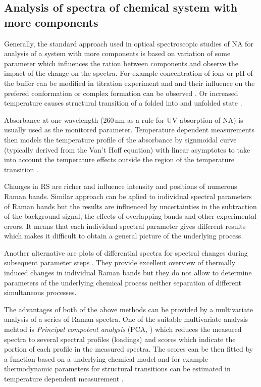 \subsection{Analysis of spectra of chemical system with more components}

Generally, the standard approach used in optical spectroscopic studies of NA
for analysis of a system with more components is based on variation of some
parameter which influences the ration between components and observe the
impact of the change on the spectra.
For example concentration of ions or pH of the buffer can be modified in
titration experiment and and their influence on the prefered conformation or
complex formation can be observed
\parencite{Klener2015}.
Or increased temperature causes structural transition of a folded into and
unfolded state
\parencite{Klener2021}.

Absorbance at one wavelength (260\,nm as a rule for UV absorption of NA) is
usually used as the monitored parameter.
Temperature dependent measurements then models the temperature profile of the
absorbance by signmoidal curve (typically derived from the Van't Hoff equation)
with linear asymptotes to take into account the temperature effects outside
the region of the temperature transition
\parencite{%
	Owczarzy1997,%
	Owczarzy2005,%
	Mergny2009%
}.

Changes in RS are richer and influence intensity and positions of numerous
Raman bands.
Similar approach can be aplied to individual spectral parameters of Raman
bands
\parencite{%
	Duguid1996,%
	Mukerji1996,%
	Mercier1999,%
	Baumruk2001,%
	Movileanu2002a,%
	Knee2008%
}
but the results are influenced by uncertainties in the subtraction of the
background signal, the effects of overlapping bands and other experimental
errors.
It means that each individual spectral parameter gives different results which
makes it difficult to obtain a general picture of the underlying process.

Another alternative are plots of differential spectra for spectral changes
during subsequent parameter steps
\parencite{%
	Duguid1996,%
	Baumruk2001,%
	Chan1997,%
	Movileanu1999,%
	Movileanu2002%
}.
They provide excellent overview of thermally induced changes in individual
Raman bands but they do not allow to determine parameters of the underlying
chemical process neither separation of different simultaneous processes.

The advantages of both of the above methods can be provided by a multivariate
analysis of a series of Raman spectra.
One of the suitable multivariate analysis mehtod is
\emph{Principal compotent analysis} (PCA,
\cite{%
	Wold1987,%
	Malinowski2002%
})
which reduces the measured spectra to several spectral profiles (loadings) and
scores which indicate the portion of each profile in the measured spectra.
The scores can be then fitted by a function based on a underlying chemical
model and for example thermodynamic parameters for structural transitions
can be estimated in temperature dependent measurement
\parencite{Nemecek2013}.


